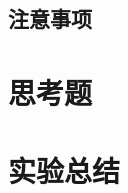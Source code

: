 \documentclass[a4paper]{article}
\begin{document}
    \subsection{注意事项}\label{subsec:20}


    \vspace{1cm}


    \section{思考题}\label{sec:8}


    \vspace{1cm}


    \section{实验总结}\label{sec:9}

    
    
\end{document}
